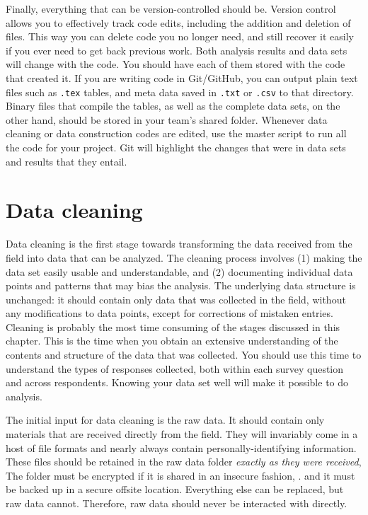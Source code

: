 Finally, everything that can be version-controlled should be. 
Version control allows you to effectively track code edits,
including the addition and deletion of files. 
This way you can delete code you no longer need, 
and still recover it easily if you ever need to get back previous work.
Both analysis results and data sets will change with the code.
You should have each of them stored with the code that created it.
If you are writing code in Git/GitHub,
you can output plain text files such as \texttt{.tex} tables,
and meta data saved in \texttt{.txt} or \texttt{.csv} to that directory.
Binary files that compile the tables,
as well as the complete data sets, on the other hand,
should be stored in your team's shared folder. 
Whenever data cleaning or data construction codes are edited,
use the master script to run all the code for your project.
Git will highlight the changes that were in data sets and results that they entail. 


\section{Data cleaning}

Data cleaning is the first stage towards transforming 
the data received from the field into data that can be analyzed.
The cleaning process involves
(1) making the data set easily usable and understandable, and
(2) documenting individual data points and patterns that may bias the analysis.
The underlying data structure is unchanged:
it should contain only data that was collected in the field,
without any modifications to data points,
except for corrections of mistaken entries.
Cleaning is probably the most time consuming of the stages discussed in this chapter.
This is the time when you obtain an extensive understanding of 
the contents and structure of the data that was collected.
You should use this time to understand the types of responses collected,
both within each survey question and across respondents.
Knowing your data set well will make it possible to do analysis.


The initial input for data cleaning is the raw data.
It should contain only materials that are received directly from the field.
They will invariably come in a host of file formats
and nearly always contain personally-identifying information.
These files should be retained in the raw data folder
\textit{exactly as they were received},
The folder must be encrypted if it is shared in an insecure fashion,
.
and it must be backed up in a secure offsite location.
Everything else can be replaced, but raw data cannot.
Therefore, raw data should never be interacted with directly.

